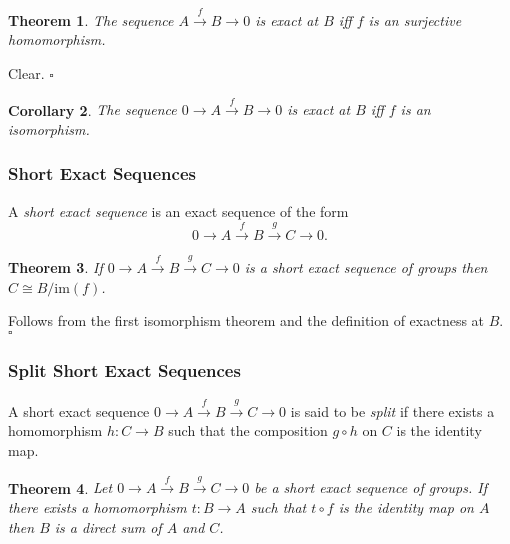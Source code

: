 \documentclass[10pt]{article}
\newtheorem{theorem}{Theorem}[section]
\newtheorem{corollary}[theorem]{Corollary}
\newenvironment{proof}[1][Proof]{\begin{trivlist}
\item[\hskip \labelsep {\itshape #1}]}{\end{trivlist}}
\newenvironment{definition}[1][Definition]{\begin{trivlist}
\item[\hskip \labelsep {\bfseries #1}]}{\end{trivlist}}
\begin{document}
\begin{theorem}
The sequence $A \overset{f}{\longrightarrow} B \longrightarrow 0$ is exact at $B$ iff $f$ is an surjective homomorphism.
\end{theorem}

\begin{proof}
Clear. $\square$
\end{proof}

\begin{corollary}
The sequence $0 \longrightarrow A \overset{f}{\longrightarrow} B \longrightarrow 0$ is exact at $B$ iff $f$ is an isomorphism.
\end{corollary}

\subsubsection{Short Exact Sequences}

\begin{definition}
A \emph{short exact sequence} is an exact sequence of the form
$$0 \longrightarrow A \overset{f}{\longrightarrow} B \overset{g}{\longrightarrow} C \longrightarrow 0.$$
\end{definition}

\begin{theorem}
If $0 \longrightarrow A \overset{f}{\longrightarrow} B \overset{g}{\longrightarrow} C \longrightarrow 0$ is a short exact sequence of groups then $C \cong B/\mbox{im}(f)$.
\end{theorem}

\begin{proof}
Follows from the first isomorphism theorem and the definition of exactness at $B$. $\square$
\end{proof}

\subsubsection{Split Short Exact Sequences}

\begin{definition}
A short exact sequence $0 \longrightarrow A \overset{f}{\longrightarrow} B \overset{g}{\longrightarrow} C \longrightarrow 0$ is said to be \emph{split} if there exists a homomorphism $h : C \to B$ such that the composition $g\circ h$ on $C$ is the identity map.
\end{definition}

\begin{theorem}
Let $0 \longrightarrow A \overset{f}{\longrightarrow} B \overset{g}{\longrightarrow} C \longrightarrow 0$ be a short exact sequence of groups. If there exists a homomorphism $t : B \to A$ such that $t\circ f$ is the identity map on $A$ then $B$ is a direct sum of $A$ and $C$.
\end{theorem}
\end{document}
